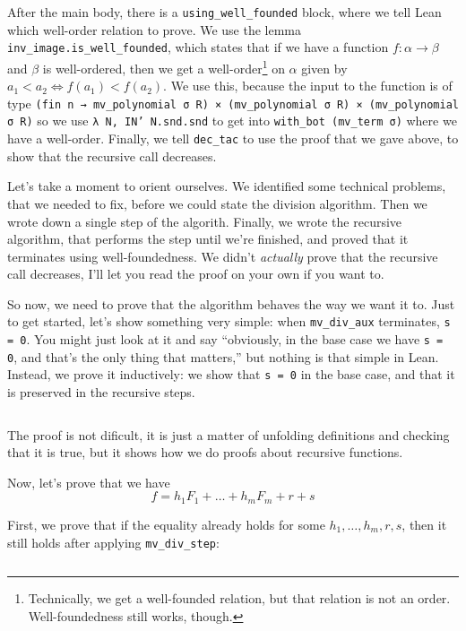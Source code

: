 \documentclass[a4paper, 12pt]{article}
\newcommand{\lean}[1]{\texttt{#1}}
\theoremstyle{changedot}
\theoremstyle{changedotbreak}
\theoremstyle{nonumberplain}
\begin{document}
After the main body, there is a \lean{using_well_founded} block, where we tell Lean which well-order relation to prove. We use the lemma \lean{inv_image.is_well_founded}, which states that if we have a function $f : \alpha \to \beta$ and $\beta$ is well-ordered, then we get a well-order\footnote{Technically, we get a well-founded relation, but that relation is not an order. Well-foundedness still works, though.} on $\alpha$ given by $a_{1} < a_{2} \iff f(a_{1}) < f(a_{2})$. We use this, because the input to the function is of type \lean{(fin n → mv_polynomial σ R) ×
  (mv_polynomial σ R) × (mv_polynomial σ R)} so we use \lean{λ N, IN' N.snd.snd} to get into \lean{with_bot (mv_term σ)} where we have a well-order. Finally, we tell \lean{dec_tac} to use the proof that we gave above, to show that the recursive call decreases.

Let's take a moment to orient ourselves. We identified some technical problems, that we needed to fix, before we could state the division algorithm. Then we wrote down a single step of the algorith. Finally, we wrote the recursive algorithm, that performs the step until we're finished, and proved that it terminates using well-foundedness. We didn't \textit{actually} prove that the recursive call decreases, I'll let you read the proof on your own if you want to.

So now, we need to prove that the algorithm behaves the way we want it to. Just to get started, let's show something very simple: when \lean{mv_div_aux} terminates, \lean{s = 0}. You might just look at it and say ``obviously, in the base case we have \lean{s = 0}, and that's the only thing that matters,'' but nothing is that simple in Lean. Instead, we prove it inductively: we show that \lean{s = 0} in the base case, and that it is preserved in the recursive steps.

\inputminted[firstline=332, lastline=350]{lean}{../src/mv_division.lean}

The proof is not dificult, it is just a matter of unfolding definitions and checking that it is true, but it shows how we do proofs about recursive functions.

Now, let's prove that we have \[f = h_{1}F_{1} + \dots + h_{m}F_{m} + r + s\]

First, we prove that if the equality already holds for some $h_{1}, \dots, h_{m}, r, s$, then it still holds after applying \lean{mv_div_step}:

\inputminted[firstline=59, lastline=66]{lean}{../src/mv_division.lean}
\end{document}
